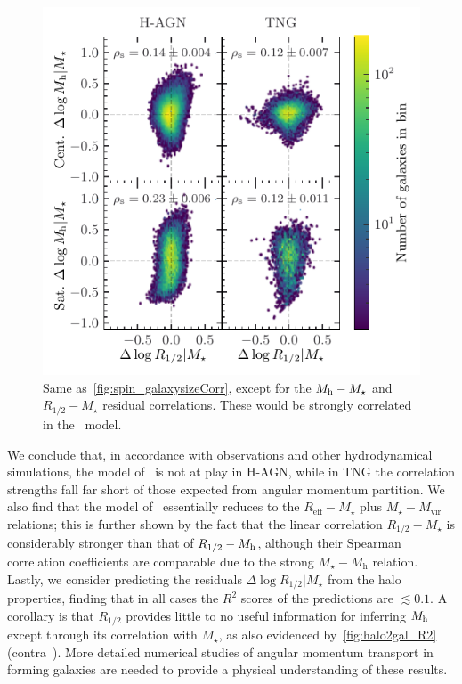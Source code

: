 \documentclass[usenatbib,useAMS]{mnras}
\begin{document}
\begin{figure}
    \centering
    \includegraphics[width=\columnwidth]{Figures/Reff_residuals_corr.pdf}
    \caption{Same as~\cref{fig:spin_galaxysizeCorr}, except for the $M_{\rm h}-M_\star$ and $R_{1/2}-M_\star$ residual correlations. These would be strongly correlated in the~\citet{Kravtsov_2013} model.}
    \label{fig:MvirMstarReff_corr}
\end{figure}



We conclude that, in accordance with observations and other hydrodynamical simulations, the model of~\citeauthor{MMW_1998} is not at play in H-AGN, while in TNG the correlation strengths fall far short of those expected from angular momentum partition. We also find that the model of~\citeauthor{Kravtsov_2013} essentially reduces to the $R_\text{eff}-M_\star$ plus $M_\star-M_\text{vir}$ relations; this is further shown by the fact that the linear correlation $R_{1/2} - M_\star$ is considerably stronger than that of $R_{1/2} - M_{\rm h}$, although their Spearman correlation coefficients are comparable due to the strong $M_\star-M_\text{h}$ relation. Lastly, we consider predicting the residuals $\Delta \log R_{1/2}|M_\star$ from the halo properties, finding that in all cases the $R^2$ scores of the predictions are $\lesssim 0.1$. A corollary is that $R_{1/2}$ provides little to no useful information for inferring $M_{\rm h}$ except through its correlation with $M_\star$, as also evidenced by~\cref{fig:halo2gal_R2} (contra~\citealt{Rohr}). More detailed numerical studies of angular momentum transport in forming galaxies are needed to provide a physical understanding of these results.
\end{document}
